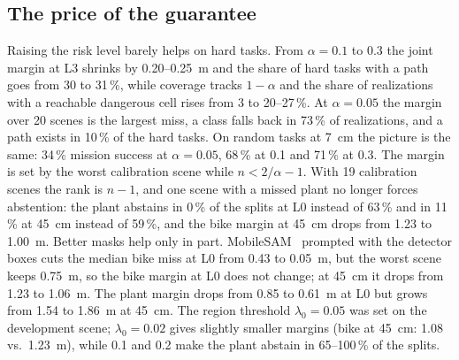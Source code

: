 \documentclass[conference]{IEEEtran}
\theoremstyle{definition}
\begin{document}
\subsection{The price of the guarantee}

Raising the risk level barely helps on hard tasks. From $\alpha = 0.1$ to $0.3$ the joint margin at L3 shrinks by
0.20--0.25~m and the share of hard tasks with a path goes from 30 to 31\,\%, while coverage tracks $1 - \alpha$ and the
share of realizations with a reachable dangerous cell rises from 3 to 20--27\,\%. At $\alpha = 0.05$ the margin over 20
scenes is the largest miss, a class falls back in 73\,\% of realizations, and a path exists in 10\,\% of the hard tasks.
On random tasks at 7~cm the picture is the same: 34\,\% mission success at $\alpha = 0.05$, 68\,\% at 0.1 and
71\,\% at 0.3.
The margin is set by the worst calibration scene while $n < 2/\alpha - 1$. With 19 calibration scenes the rank is
$n - 1$, and one scene with a missed plant no longer forces abstention: the plant abstains in 0\,\% of the splits at L0
instead of 63\,\% and in 11\,\% at 45~cm instead of 59\,\%, and the bike margin at 45~cm drops from 1.23 to 1.00~m.
Better masks help only in part. MobileSAM~\cite{mobilesam} prompted with the detector boxes cuts the median bike miss
at L0 from 0.43 to 0.05~m, but the worst scene keeps 0.75~m, so the bike margin at L0 does not change; at 45~cm it drops
from 1.23 to 1.06~m. The plant margin drops from 0.85 to 0.61~m at L0 but grows from 1.54 to 1.86~m at 45~cm. The region
threshold $\lambda_0 = 0.05$ was set on the development scene; $\lambda_0 = 0.02$ gives slightly smaller margins (bike
at 45~cm: 1.08 vs.\ 1.23~m), while 0.1 and 0.2 make the plant abstain in 65--100\,\% of the splits.
\end{document}
